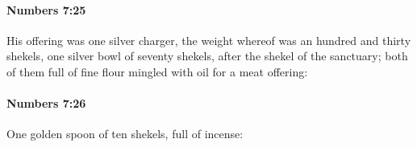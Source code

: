 		\paragraph{Numbers 7:25} %
			\label{NUMBERS-7-25}

			His offering was one silver charger, the weight whereof was an hundred and thirty shekels, one silver bowl of seventy shekels, after the shekel of the sanctuary; both of them full of fine flour mingled with oil for a meat offering:


		\paragraph{Numbers 7:26} %
			\label{NUMBERS-7-26}

			One golden spoon of ten shekels, full of incense:


